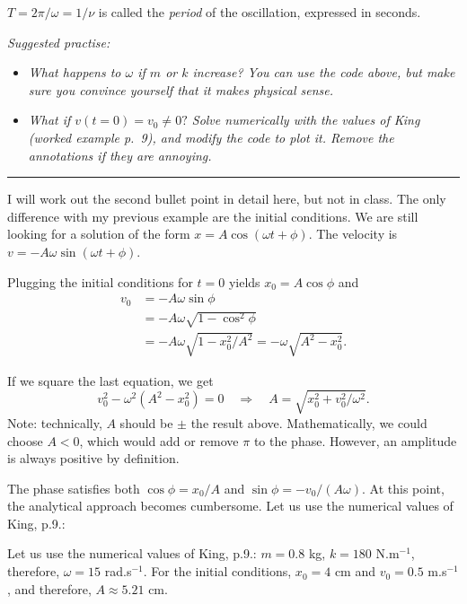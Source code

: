 \documentclass[11pt]{article}
\begin{document}
    \(T = 2\pi/\omega = 1/\nu\) is called the \emph{period} of the
oscillation, expressed in seconds.

    \emph{Suggested practise:}

\begin{itemize}
\item
  \emph{What happens to \(\omega\) if \(m\) or \(k\) increase? You can
  use the code above, but make sure you convince yourself that it makes
  physical sense.}
\item
  \emph{What if \(v(t=0) = v_0 \neq 0?\) Solve numerically with the
  values of King (worked example p.~9), and modify the code to plot it.
  Remove the annotations if they are annoying.}
\end{itemize}

    \begin{center}\rule{0.5\linewidth}{\linethickness}\end{center}

I will work out the second bullet point in detail here, but not in
class. The only difference with my previous example are the initial
conditions. We are still looking for a solution of the form
\(x = A\cos(\omega t + \phi)\). The velocity is
\(v = -A\omega\sin(\omega t + \phi)\).

Plugging the initial conditions for \(t=0\) yields \(x_0 = A \cos\phi\)
and \begin{align*}
    v_0 & = -A\omega\sin\phi \\
        & = -A\omega\sqrt{1-\cos^2\phi} \\
        & = -A\omega\sqrt{1-x_0^2/A^2} = -\omega\sqrt{A^2-x_0^2}.
\end{align*}

    If we square the last equation, we get
\[ v_0^2 - \omega^2(A^2 - x_0^2) = 0 \quad\Rightarrow\quad  A = \sqrt{x_0^2 + v_0^2/\omega^2}. \]
Note: technically, \(A\) should be \(\pm\) the result above.
Mathematically, we could choose \(A<0\), which would add or remove
\(\pi\) to the phase. However, an amplitude is always positive by
definition.

    The phase satisfies both \(\cos\phi = x_0/A\) and
\(\sin\phi = -v_0/(A\omega)\). At this point, the analytical approach
becomes cumbersome. Let us use the numerical values of King, p.9.:

    Let us use the numerical values of King, p.9.: \(m = 0.8\) kg,
\(k = 180\) N.m\(^{-1}\), therefore, \(\omega = 15\) rad.s\(^{-1}\). For
the initial conditions, \(x_0 = 4\) cm and \(v_0 = 0.5\) m.s\(^{-1}\),
and therefore, \(A \approx 5.21\) cm.
\end{document}
